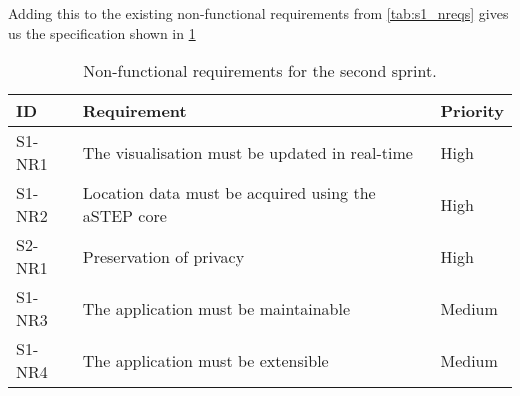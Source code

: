 Adding this to the existing non-functional requirements from \cref{tab:s1_nreqs} gives us the specification shown in \cref{tab:s2_nreqs}

\begin{table}[htbp]
	\centering
	\begin{tabularx}{\textwidth}{lXl}
		\toprule
		\textbf{ID} & \textbf{Requirement} & \textbf{Priority} \\
		\midrule 
		\rowcolor[HTML]{EFEFEF} 
		S1-NR1 & The visualisation must be updated in real-time & High \\
		S1-NR2 & Location data must be acquired using the aSTEP core & High \\
		\rowcolor[HTML]{EFEFEF}
		S2-NR1 & Preservation of privacy & High \\
		S1-NR3 & The application must be maintainable & Medium \\
		\rowcolor[HTML]{EFEFEF} 
		S1-NR4 & The application must be extensible & Medium \\
		\bottomrule
	\end{tabularx}
	\caption{Non-functional requirements for the second sprint.}
	\label{tab:s2_nreqs}
\end{table}
